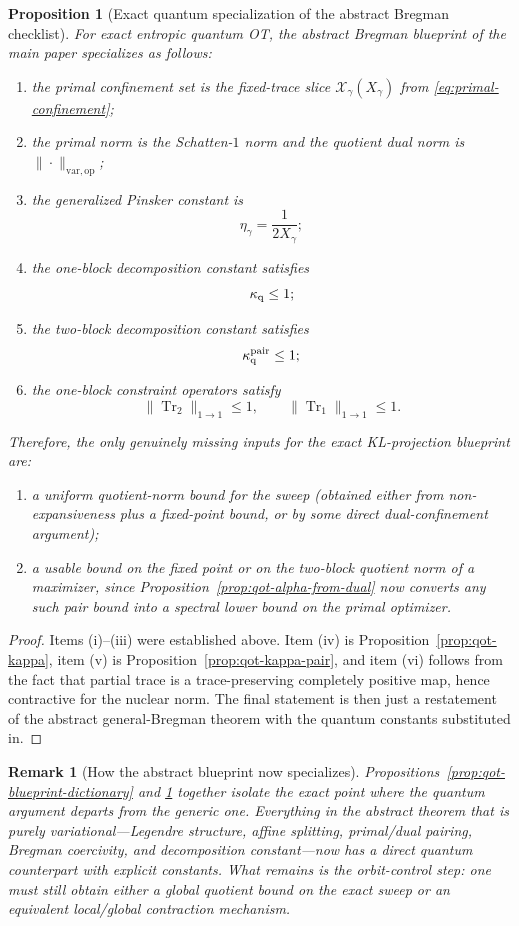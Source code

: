 \documentclass[11pt]{article}
\newcommand{\Trone}{\operatorname{Tr}_{1}}
\newcommand{\Trtwo}{\operatorname{Tr}_{2}}
\newcommand{\Xx}{\mathcal{X}}
\newcommand{\op}{\mathrm{op}}
\newcommand{\varop}{\mathrm{var},\op}
\theoremstyle{plain}
\newtheorem{proposition}{Proposition}[section]
\newtheorem{remark}{Remark}[section]
\begin{document}
\begin{proposition}[Exact quantum specialization of the abstract Bregman checklist]
\label{prop:qot-blueprint-checklist}
For exact entropic quantum OT, the abstract Bregman blueprint of the main paper specializes as follows:
\begin{enumerate}[label=\textnormal{(\roman*)}]
\item the primal confinement set is the fixed-trace slice $\Xx_\gamma(X_\gamma)$ from \eqref{eq:primal-confinement};
\item the primal norm is the Schatten-$1$ norm and the quotient dual norm is $\|\cdot\|_{\varop}$;
\item the generalized Pinsker constant is
\[
\eta_\gamma=\frac{1}{2X_\gamma};
\]
\item the one-block decomposition constant satisfies
\[
\kappa_{\rm q}\le 1;
\]
\item the two-block decomposition constant satisfies
\[
\kappa_{\rm q}^{\rm pair}\le 1;
\]
\item the one-block constraint operators satisfy
\[
\|\Trtwo\|_{1\to 1}\le 1,
\qquad
\|\Trone\|_{1\to 1}\le 1.
\]
\end{enumerate}
Therefore, the only genuinely missing inputs for the exact KL-projection blueprint are:
\begin{enumerate}[label=\textnormal{(A\arabic*)}]
\item a uniform quotient-norm bound for the sweep (obtained either from non-expansiveness plus a fixed-point bound, or by some direct dual-confinement argument);
\item a usable bound on the fixed point or on the two-block quotient norm of a maximizer, since Proposition~\ref{prop:qot-alpha-from-dual} now converts any such pair bound into a spectral lower bound on the primal optimizer.
\end{enumerate}
\end{proposition}

\begin{proof}
Items (i)--(iii) were established above.
Item (iv) is Proposition~\ref{prop:qot-kappa}, item (v) is Proposition~\ref{prop:qot-kappa-pair}, and item (vi) follows from the fact that partial trace is a trace-preserving completely positive map, hence contractive for the nuclear norm.
The final statement is then just a restatement of the abstract general-Bregman theorem with the quantum constants substituted in.
\end{proof}

\begin{remark}[How the abstract blueprint now specializes]
\label{rem:qot-blueprint-specializes}
Propositions~\ref{prop:qot-blueprint-dictionary} and \ref{prop:qot-blueprint-checklist} together isolate the exact point where the quantum argument departs from the generic one.
Everything in the abstract theorem that is purely variational---Legendre structure, affine splitting, primal/dual pairing, Bregman coercivity, and decomposition constant---now has a direct quantum counterpart with explicit constants.
What remains is the orbit-control step: one must still obtain either a global quotient bound on the exact sweep or an equivalent local/global contraction mechanism.
\end{remark}
\end{document}
